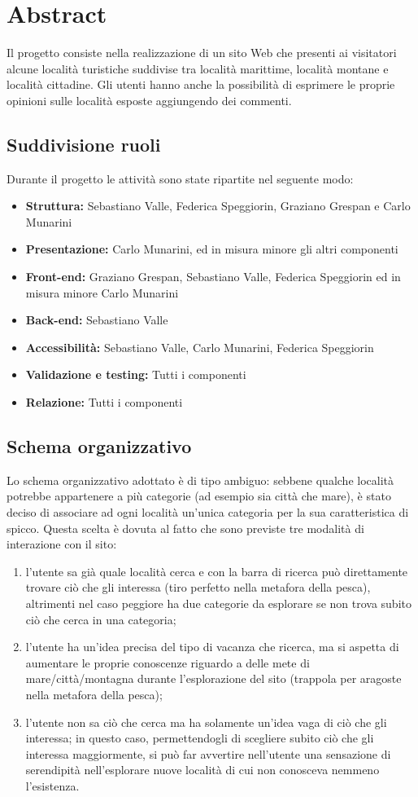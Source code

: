 \section{Abstract}
Il progetto consiste nella realizzazione di un sito Web che presenti ai
visitatori alcune località turistiche suddivise tra località marittime,
località montane e località cittadine.
Gli utenti hanno anche la possibilità di esprimere le proprie opinioni sulle
località esposte aggiungendo dei commenti.

\subsection{Suddivisione ruoli}
Durante il progetto le attività sono state ripartite nel seguente modo:
\begin{itemize}
\item \textbf{Struttura:} Sebastiano Valle, Federica Speggiorin, Graziano Grespan e Carlo Munarini
\item \textbf{Presentazione:} Carlo Munarini, ed in misura minore gli altri componenti
\item \textbf{Front-end:} Graziano Grespan, Sebastiano Valle, Federica Speggiorin ed in misura minore Carlo Munarini
\item \textbf{Back-end:} Sebastiano Valle
\item \textbf{Accessibilità:} Sebastiano Valle, Carlo Munarini, Federica Speggiorin
\item \textbf{Validazione e testing:} Tutti i componenti
\item \textbf{Relazione:} Tutti i componenti
\end{itemize}

\subsection{Schema organizzativo}
Lo schema organizzativo adottato è di tipo ambiguo: sebbene qualche località potrebbe appartenere a più categorie (ad esempio sia città che mare), è stato deciso di associare ad ogni località un'unica categoria per la sua caratteristica di spicco.
Questa scelta è dovuta al fatto che sono previste tre modalità di interazione con il sito:
\begin{enumerate}
\item  l'utente sa già quale località cerca e con la barra di ricerca può direttamente trovare ciò che gli interessa (tiro perfetto nella metafora della pesca), altrimenti nel caso peggiore ha due categorie da esplorare se non trova subito ciò che cerca in una categoria;
\item l'utente ha un'idea precisa del tipo di vacanza che ricerca, ma si aspetta di aumentare le proprie conoscenze riguardo a delle mete di mare/città/montagna durante l'esplorazione del sito (trappola per aragoste nella metafora della pesca);
\item l'utente non sa ciò che cerca ma ha solamente un'idea vaga di ciò che gli interessa; in questo caso, permettendogli di scegliere subito ciò che gli interessa maggiormente, si può far avvertire nell'utente una sensazione di serendipità nell'esplorare nuove località di cui non conosceva nemmeno l'esistenza.
\end{enumerate}
